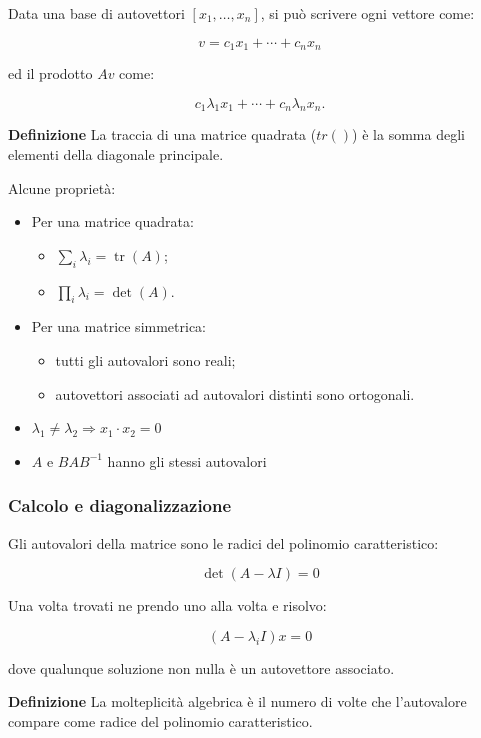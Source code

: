 \documentclass{article}
\newcommand{\df}{\noindent\textbf{Definizione} }
\begin{document}
Data una base di autovettori $[x_1,\ldots,x_n]$, si può scrivere ogni vettore come:

\[
v=c_1x_1+\cdots+c_nx_n
\]

ed il prodotto $Av$ come:

\[
c_1\lambda_1x_1+\cdots+c_n\lambda_nx_n.
\]\newline

\df La traccia di una matrice quadrata ($tr()$) è la somma degli elementi della diagonale principale.\newline

Alcune proprietà:
\begin{itemize}
    \item Per una matrice quadrata:
        \begin{itemize}
            \item $\sum_i\lambda_i=\operatorname{tr}(A)$;
            \item $\prod_i\lambda_i=\det(A)$.
        \end{itemize}
    \item Per una matrice simmetrica:
        \begin{itemize}
            \item tutti gli autovalori sono reali;
            \item autovettori associati ad autovalori distinti sono ortogonali.
        \end{itemize}
     \item $\lambda_1\neq\lambda_2\Rightarrow x_1\cdot x_2=0$
     \item $A$ e $BAB^{-1}$ hanno gli stessi autovalori
\end{itemize}\newpage

\subsubsection{Calcolo e diagonalizzazione}

Gli autovalori della matrice sono le radici del polinomio caratteristico:

$$\det(A-\lambda I)=0$$

Una volta trovati ne prendo uno alla volta e risolvo:

\[
(A-\lambda_i I)x=0
\]

dove qualunque soluzione non nulla è un autovettore associato.\newline

\df La molteplicità algebrica è il numero di volte che l'autovalore compare come radice del polinomio caratteristico.\newline
\end{document}
